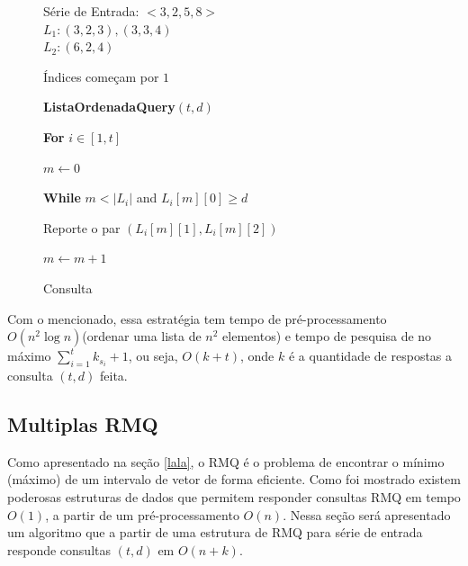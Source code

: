 \documentclass[12pt]{article}
\begin{document}
\begin{center}
\begin{figure}
\begin{framed}
Série de Entrada: $<3, 2, 5, 8>$ \\
$L_1: (3, 2, 3), (3, 3, 4)$ \\
$L_2: (6, 2, 4)$ \\
\end{framed}
\label{fig:exemplolista}
\caption{Índices começam por $1$}
\end{figure}
\end{center}


\begin{center}
\begin{figure}
\begin{framed}

{\bf ListaOrdenadaQuery}$(t, d)$

\hspace{1cm} {\bf For} $i \in [1, t]$

\hspace{2cm} $m \leftarrow 0$

\hspace{2cm} {\bf While} $m < |L_i|$ and $L_i[m][0] \ge d$

\hspace{3cm} Reporte o par $(L_i[m][1], L_i[m][2])$

\hspace{3cm} $m \leftarrow m + 1$
\end{framed}
\label{fig:listaquery}
\caption{Consulta}
\end{figure}
\end{center}

Com o mencionado, essa estratégia tem tempo de pré-processamento $O(n^2 \log n)$(ordenar uma lista de $n^2$ elementos) 
e tempo de pesquisa de no máximo $\sum_{i = 1}^{t} k_{s_i} + 1$, ou seja, $O(k + t)$,
onde $k$ é a quantidade de respostas a consulta $(t,d)$ feita.

\subsection{Multiplas RMQ}

Como apresentado na seção \ref{lala}, o RMQ é o problema de 
encontrar o mínimo (máximo) de um intervalo de vetor de forma 
eficiente. Como foi mostrado existem poderosas estruturas
de dados que permitem responder consultas RMQ em tempo $O(1)$, a partir de um pré-processamento $O(n)$. 
Nessa seção será apresentado um algoritmo que a partir de uma estrutura de RMQ para série
de entrada responde consultas $(t, d)$ em $O(n + k)$. 
\end{document}
